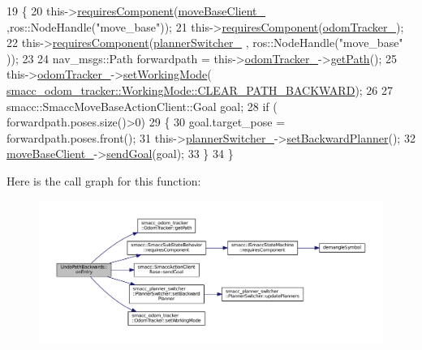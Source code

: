 \begin{DoxyCode}
19   \{
20     this->\hyperlink{classsmacc_1_1SmaccSubStateBehavior_a4d25c4ba8ec01c489df172a71bb1c37d}{requiresComponent}(\hyperlink{classUndoPathBackwards_ac9b783f5d06850fe1c3f03bb1308ca2f}{moveBaseClient\_} ,ros::NodeHandle(\textcolor{stringliteral}{"move\_base"}));
21     this->\hyperlink{classsmacc_1_1SmaccSubStateBehavior_a4d25c4ba8ec01c489df172a71bb1c37d}{requiresComponent}(\hyperlink{classUndoPathBackwards_a7700dd293e08d1383f9e9247329480bc}{odomTracker\_});
22     this->\hyperlink{classsmacc_1_1SmaccSubStateBehavior_a4d25c4ba8ec01c489df172a71bb1c37d}{requiresComponent}(\hyperlink{classUndoPathBackwards_a88c201f6b358634091afec44002e5f28}{plannerSwitcher\_} , ros::NodeHandle(\textcolor{stringliteral}{"move\_base"}
      ));   
23 
24     nav\_msgs::Path forwardpath = this->\hyperlink{classUndoPathBackwards_a7700dd293e08d1383f9e9247329480bc}{odomTracker\_}->\hyperlink{classsmacc__odom__tracker_1_1OdomTracker_ace0762f93bc272a426d3038f74dc8752}{getPath}();
25     this->\hyperlink{classUndoPathBackwards_a7700dd293e08d1383f9e9247329480bc}{odomTracker\_}->\hyperlink{classsmacc__odom__tracker_1_1OdomTracker_a38fbca999297c46dc95628cc60851a45}{setWorkingMode}(
      \hyperlink{namespacesmacc__odom__tracker_ade9730dd5cc10ccfad9362176cf46c33a0cf8f27617189e35619df3c18bda6274}{smacc\_odom\_tracker::WorkingMode::CLEAR\_PATH\_BACKWARD});
26     
27     smacc::SmaccMoveBaseActionClient::Goal goal;
28     \textcolor{keywordflow}{if} ( forwardpath.poses.size()>0)
29     \{
30       goal.target\_pose = forwardpath.poses.front();
31       this->\hyperlink{classUndoPathBackwards_a88c201f6b358634091afec44002e5f28}{plannerSwitcher\_}->\hyperlink{classsmacc__planner__switcher_1_1PlannerSwitcher_a848558a4309a42c546ab87e65722da2f}{setBackwardPlanner}();
32       \hyperlink{classUndoPathBackwards_ac9b783f5d06850fe1c3f03bb1308ca2f}{moveBaseClient\_}->\hyperlink{classsmacc_1_1SmaccActionClientBase_a58c67a87c5fb8ea1633573c58fe3eee1}{sendGoal}(goal);
33     \}
34   \}    
\end{DoxyCode}


Here is the call graph for this function\+:
\nopagebreak
\begin{figure}[H]
\begin{center}
\leavevmode
\includegraphics[width=350pt]{classUndoPathBackwards_a073a69a9e7b89d38faaab47096df292c_cgraph}
\end{center}
\end{figure}




